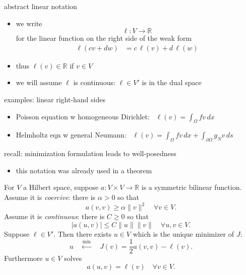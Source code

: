 \documentclass[10pt,
               svgnames,
               hyperref={colorlinks,
                         citecolor=DeepPink4,
                         linkcolor=FireBrick,
                         urlcolor=blue},
               usepdftitle=false]{beamer}
\newcommand{\RR}{\mathbb{R}}
\newcommand{\ds}{\displaystyle}
\begin{document}
\begin{frame}{abstract linear notation}

\begin{itemize}
\item we write
    $$\ell:V \to \RR$$
for the \alert{linear function} on the right side of the weak form
\begin{align*}
\ell(cv+dw) &= c\, \ell(v) + d\, \ell(w)
\end{align*}
\item thus $\ell(v) \in \RR$ if $v\in V$
\item we will assume $\ell$ is continuous: $\ell \in V'$ is in the dual space
\end{itemize}

\begin{block}{examples: linear right-hand sides}
\begin{itemize}
\item Poisson equation w homogeneous Dirichlet: \, $\ds \ell(v) = \int_\Omega f v\,dx$
\item Helmholtz eqn w general Neumann: \, $\ds \ell(v) = \int_\Omega f v\,dx + \int_{\partial\Omega} g_N v\,ds$
\end{itemize}
\end{block}
\end{frame}


\begin{frame}{recall: minimization formulation leads to well-posedness}

\begin{itemize}
\item this notation was already used in a theorem
\end{itemize}

\begin{theorem}
For $V$ a Hilbert space, suppose $a:V\times V\to \RR$ is a symmetric bilinear function.  Assume it is \emph{coercive}: there is $\alpha>0$ so that
	$$a(v,v) \ge \alpha \|v\|^2 \quad \forall v \in V.$$
Assume it is \emph{continuous}: there is $C\ge 0$ so that
	$$|a(u,v)| \le C \|u\|\|v\| \quad \forall u,v \in V.$$
Suppose $\ell\in V'$.  Then there exists $u\in V$ which is the unique minimizer of $J$:
	$$u \quad \stackrel{\min}{\leftarrow} \quad J(v) = \frac{1}{2} a(v,v) - \ell(v).$$
Furthermore $u\in V$ solves
	$$a(u,v) = \ell(v) \quad \forall v\in V.$$
\end{theorem}
\end{frame}
\end{document}
